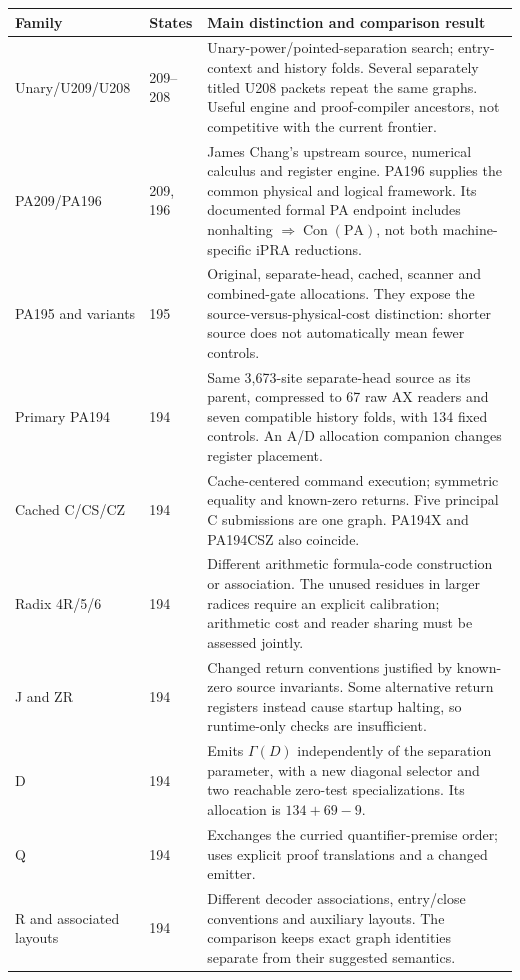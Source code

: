 \documentclass[11pt,letterpaper]{article}
\newcommand{\PA}{\mathrm{PA}}
\newcommand{\Con}{\operatorname{Con}}
\begin{document}
\begin{longtable}{@{}p{.20\linewidth}p{.13\linewidth}p{.60\linewidth}@{}}
\toprule Family & States & Main distinction and comparison result\\\midrule\endhead
Unary/U209/U208 & 209--208 & Unary-power/pointed-separation search; entry-context and history folds. Several separately titled U208 packets repeat the same graphs. Useful engine and proof-compiler ancestors, not competitive with the current frontier.\\[4pt]
PA209/PA196 & 209, 196 & James Chang's upstream source, numerical calculus and register engine. PA196 supplies the common physical and logical framework. Its documented formal PA endpoint includes nonhalting $\Rightarrow\Con(\PA)$, not both machine-specific iPRA reductions.\\[4pt]
PA195 and variants & 195 & Original, separate-head, cached, scanner and combined-gate allocations. They expose the source-versus-physical-cost distinction: shorter source does not automatically mean fewer controls.\\[4pt]
Primary PA194 & 194 & Same 3,673-site separate-head source as its parent, compressed to 67 raw AX readers and seven compatible history folds, with 134 fixed controls. An A/D allocation companion changes register placement.\\[4pt]
Cached C/CS/CZ & 194 & Cache-centered command execution; symmetric equality and known-zero returns. Five principal C submissions are one graph. PA194X and PA194CSZ also coincide.\\[4pt]
Radix 4R/5/6 & 194 & Different arithmetic formula-code construction or association. The unused residues in larger radices require an explicit calibration; arithmetic cost and reader sharing must be assessed jointly.\\[4pt]
J and ZR & 194 & Changed return conventions justified by known-zero source invariants. Some alternative return registers instead cause startup halting, so runtime-only checks are insufficient.\\[4pt]
D & 194 & Emits $\Gamma(D)$ independently of the separation parameter, with a new diagonal selector and two reachable zero-test specializations. Its allocation is $134+69-9$.\\[4pt]
Q & 194 & Exchanges the curried quantifier-premise order; uses explicit proof translations and a changed emitter.\\[4pt]
R and associated layouts & 194 & Different decoder associations, entry/close conventions and auxiliary layouts. The comparison keeps exact graph identities separate from their suggested semantics.\\[4pt]

\end{longtable}
\end{document}
